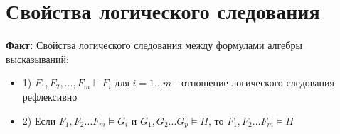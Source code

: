 \documentclass[../main.tex]{subfiles}
\begin{document}
\section{Свойства логического следования}
\textbf{Факт:
}Свойства логического следования между формулами алгебры высказываний:
\begin{itemize}
	\item 1) $F_1, F_2, \ldots, F_m\vDash F_i$ для $i=1 \ldots m$ - отношение логического следования рефлексивно
	\item 2) Если $F_1, F_2 \ldots F_m\vDash G_i$ и $G_1,G_2 \ldots G_p\vDash H$, то $F_1, F_2 \ldots F_m\vDash H$ \\
\end{itemize}
\end{document}
